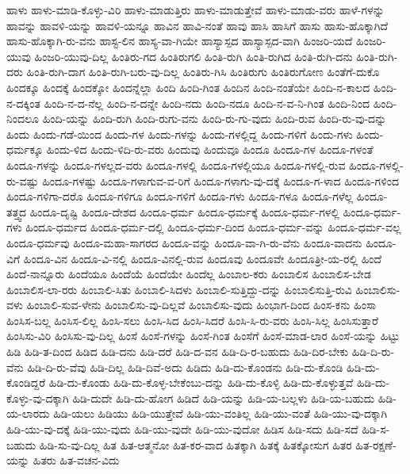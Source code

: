 {ಹಾಳು
ಹಾಳು-ಮಾಡಿ-ಕೊಳ್ಳು-ವಿರಿ
ಹಾಳು-ಮಾಡುತ್ತಿರು
ಹಾಳು-ಮಾಡುತ್ತೇವೆ
ಹಾಳು-ಮಾಡು-ವರು
ಹಾಳೆ-ಗಳನ್ನು
ಹಾವನ್ನು
ಹಾವಳಿ-ಯನ್ನು
ಹಾವಳಿ-ಯನ್ನೂ
ಹಾವಿನ
ಹಾವಿ-ನಂತೆ
ಹಾವು
ಹಾಸಿ
ಹಾಸಿಗೆ
ಹಾಸು
ಹಾಸು-ಹೊಕ್ಕಾಗಿದೆ
ಹಾಸು-ಹೊಕ್ಕಾಗಿ-ರು-ವನು
ಹಾಸ್ಟ-ಲಿನ
ಹಾಸ್ಯ-ವಾ-ಗಿಯೇ
ಹಾಸ್ಯಾಸ್ಪದ
ಹಾಸ್ಯಾಸ್ಪದ-ವಾಗಿ
ಹಿಂಜರಿ-ಯದೆ
ಹಿಂಜರಿ-ಯುವು
ಹಿಂಜರಿ-ಯುವು-ದಿಲ್ಲ
ಹಿಂತಿರು-ಗದ
ಹಿಂತಿರುಗಲಿ
ಹಿಂತಿ-ರುಗಿ
ಹಿಂತಿ-ರುಗಿದ
ಹಿಂತಿ-ರುಗಿ-ದನು
ಹಿಂತಿ-ರುಗಿ-ದರು
ಹಿಂತಿ-ರುಗಿ-ದಾಗ
ಹಿಂತಿ-ರುಗಿ-ಬರು-ವು-ದಿಲ್ಲ
ಹಿಂತಿರು-ಗಿಸಿ
ಹಿಂತಿರುಗು
ಹಿಂತಿರುಗೋಣ
ಹಿಂತೆಗೆ-ದುಕೊ
ಹಿಂದಕ್ಕೂ
ಹಿಂದಕ್ಕೆ
ಹಿಂದಕ್ಕೋ
ಹಿಂದನ್ನೆಲ್ಲಾ
ಹಿಂದಿ
ಹಿಂದಿ-ಗಿಂತ
ಹಿಂದಿನ
ಹಿಂದಿ-ನಂತೆಯೇ
ಹಿಂದಿ-ನ-ಕಾಲದ
ಹಿಂದಿ-ನ-ದಕ್ಕಿಂತ
ಹಿಂದಿ-ನ-ದ-ನೆಲ್ಲ
ಹಿಂದಿ-ನ-ದನ್ನೇ
ಹಿಂದಿ-ನದು
ಹಿಂದಿ-ನದೂ
ಹಿಂದಿ-ನ-ವ-ನಿ-ಗಿಂತ
ಹಿಂದಿ-ನಿಂದ
ಹಿಂದಿ-ನಿಂದಲೂ
ಹಿಂದಿ-ಯನ್ನು
ಹಿಂದಿ-ರುಗಿ
ಹಿಂದಿ-ರುಗು-ವನು
ಹಿಂದಿ-ರು-ಗು-ವುದು
ಹಿಂದಿ-ರುವ
ಹಿಂದಿ-ರು-ವು-ದನ್ನು
ಹಿಂದು
ಹಿಂದು-ಗಡೆ-ಯಿಂದ
ಹಿಂದು-ಗಳ
ಹಿಂದು-ಗಳನ್ನು
ಹಿಂದು-ಗಳಲ್ಲಿದ್ದ
ಹಿಂದು-ಗಳಿಗೆ
ಹಿಂದು-ಗಳು
ಹಿಂದು-ಧರ್ಮಕ್ಕೂ
ಹಿಂದು-ಳಿದ
ಹಿಂದು-ಳಿದಿ-ರು-ವರು
ಹಿಂದುವು
ಹಿಂದುವೂ
ಹಿಂದೂ
ಹಿಂದೂ-ಗಳ
ಹಿಂದೂ-ಗಳಂತೆ
ಹಿಂದೂ-ಗಳನ್ನು
ಹಿಂದೂ-ಗಳಲ್ಲದ-ವರು
ಹಿಂದೂ-ಗಳಲ್ಲಿ
ಹಿಂದೂ-ಗಳಲ್ಲಿಯೂ
ಹಿಂದೂ-ಗಳಲ್ಲಿ-ರುವ
ಹಿಂದೂ-ಗಳಲ್ಲಿ-ರು-ವಷ್ಟು
ಹಿಂದೂ-ಗಳಷ್ಟು
ಹಿಂದೂ-ಗಳಾಗುವ-ವ-ರಿಗೆ
ಹಿಂದೂ-ಗಳಾಗು-ವು-ದಕ್ಕೆ
ಹಿಂದೂ-ಗ-ಳಾದ
ಹಿಂದೂ-ಗಳಿಂದ
ಹಿಂದೂ-ಗಳಿಗಾ-ದರೊ
ಹಿಂದೂ-ಗಳಿಗೂ
ಹಿಂದೂ-ಗಳಿಗೆ
ಹಿಂದೂ-ಗಳು
ಹಿಂದೂ-ಗಳೂ
ಹಿಂದೂ-ಗಳೆಲ್ಲ
ಹಿಂದೂ-ತತ್ತ್ವದ
ಹಿಂದೂ-ದೃಷ್ಟಿ
ಹಿಂದೂ-ದೇಶದ
ಹಿಂದೂ-ಧರ್ಮ
ಹಿಂದೂ-ಧರ್ಮಕ್ಕೆ
ಹಿಂದೂ-ಧರ್ಮ-ಗಳಲ್ಲಿ
ಹಿಂದೂ-ಧರ್ಮ-ಗಳು
ಹಿಂದೂ-ಧರ್ಮದ
ಹಿಂದೂ-ಧರ್ಮ-ದಲ್ಲಿ
ಹಿಂದೂ-ಧರ್ಮ-ದಿಂದ
ಹಿಂದೂ-ಧರ್ಮ-ವನ್ನು
ಹಿಂದೂ-ಧರ್ಮ-ವಲ್ಲ
ಹಿಂದೂ-ಧರ್ಮವು
ಹಿಂದೂ-ಮಹಾ-ಸಾಗರದ
ಹಿಂದೂ-ವನ್ನು
ಹಿಂದೂ-ವಾ-ಗಿ-ರು-ವೆನು
ಹಿಂದೂ-ವಾದನು
ಹಿಂದೂ-ವಿಗೆ
ಹಿಂದೂ-ವಿನ
ಹಿಂದೂ-ವಿ-ನಲ್ಲಿ
ಹಿಂದೂ-ವಿನಲ್ಲಿ-ರುವ
ಹಿಂದೂವು
ಹಿಂದೂವೇ
ಹಿಂದೂತ್ರೀ-ಯ-ರಲ್ಲಿ
ಹಿಂದೆ
ಹಿಂದೆ-ನಾನ್ನೂರು
ಹಿಂದೆಯೂ
ಹಿಂದೆಯೆ
ಹಿಂದೆಯೇ
ಹಿಂದೆಲ್ಲ
ಹಿಂಬಾಲ-ಕರು
ಹಿಂಬಾಲಿಸ
ಹಿಂಬಾಲಿಸ-ಬೇಡ
ಹಿಂಬಾಲಿಸ-ಲಾ-ರರು
ಹಿಂಬಾಲಿ-ಸಿತು
ಹಿಂಬಾಲಿ-ಸಿದಳು
ಹಿಂಬಾಲಿ-ಸುತ್ತಿದ್ದು-ದನ್ನು
ಹಿಂಬಾಲಿಸುತ್ತಿ-ರುವಿ
ಹಿಂಬಾಲಿಸು-ವಳು
ಹಿಂಬಾಲಿ-ಸುವ-ಳೇನು
ಹಿಂಬಾಲಿಸು-ವು-ದಿಲ್ಲವೆ
ಹಿಂಬಾಲಿಸು-ವುದು
ಹಿಂಭಾಗ-ದಿಂದ
ಹಿಂಸ-ಕನು
ಹಿಂಸಾ
ಹಿಂಸಿಸ-ಬಲ್ಲ
ಹಿಂಸಿಸ-ಲಿಲ್ಲ
ಹಿಂಸಿ-ಸಲು
ಹಿಂಸಿ-ಸಿದ
ಹಿಂಸಿ-ಸಿದರೆ
ಹಿಂಸಿ-ಸಿ-ರು-ವರು
ಹಿಂಸಿ-ಸಿಲ್ಲ
ಹಿಂಸಿಸುತ್ತಾರೆ
ಹಿಂಸಿಸು-ವಿರಿ
ಹಿಂಸಿಸು-ವು-ದಿಲ್ಲ
ಹಿಂಸೆ
ಹಿಂಸೆ-ಗಳನ್ನು
ಹಿಂಸೆ-ಗಿಂತ
ಹಿಂಸೆಗೆ
ಹಿಂಸೆ-ಮಾಡ-ಲಾರ
ಹಿಂಸೆ-ಯನ್ನು
ಹಿಟ್ಟು
ಹಿಡಿ
ಹಿಡಿ-ತ-ದಿಂದ
ಹಿಡಿದ
ಹಿಡಿ-ದನು
ಹಿಡಿ-ದರೆ
ಹಿಡಿ-ದ-ವನ
ಹಿಡಿ-ದಿ-ರ-ಬಹುದು
ಹಿಡಿ-ದಿರ-ಬೇಕು
ಹಿಡಿ-ದಿ-ರು-ವೆನು
ಹಿಡಿ-ದಿ-ರು-ವೆವು
ಹಿಡಿ-ದಿಲ್ಲ
ಹಿಡಿ-ದಿವೆ-ಅದು
ಹಿಡಿದು
ಹಿಡಿ-ದು-ಕೊಂಡನು
ಹಿಡಿ-ದು-ಕೊಂಡಿ
ಹಿಡಿ-ದು-ಕೊಂಡಿದ್ದರೆ
ಹಿಡಿ-ದು-ಕೊಂಡು
ಹಿಡಿ-ದು-ಕೊಳ್ಳ-ಬೇಕೆಂಬು-ದನ್ನು
ಹಿಡಿ-ದು-ಕೊಳ್ಳಿ
ಹಿಡಿ-ದು-ಕೊಳ್ಳುತ್ತವೆ
ಹಿಡಿ-ದು-ಕೊಳ್ಳು-ವು-ದಕ್ಕಾಗಿ
ಹಿಡಿ-ದುದೇ
ಹಿಡಿ-ದು-ಹೋಗ
ಹಿಡಿದೆ
ಹಿಡಿ-ಯನ್ನು
ಹಿಡಿ-ಯ-ಬಲ್ಲಳು
ಹಿಡಿ-ಯ-ಬಹುದು
ಹಿಡಿ-ಯ-ಲಾರದು
ಹಿಡಿ-ಯಲು
ಹಿಡಿಯು
ಹಿಡಿ-ಯುತ್ತೇವೆ
ಹಿಡಿ-ಯು-ವಂತಿಲ್ಲ
ಹಿಡಿ-ಯು-ವಂತೆ
ಹಿಡಿ-ಯು-ವು-ದಕ್ಕಾಗಿ
ಹಿಡಿ-ಯು-ವು-ದಕ್ಕೆ
ಹಿಡಿ-ಯು-ವುದು
ಹಿಡಿ-ಯು-ವುದೇ
ಹಿಡಿ-ಯು-ವುದೋ
ಹಿಡಿಸ
ಹಿಡಿ-ಸದು
ಹಿಡಿ-ಸದೆ
ಹಿಡಿ-ಸ-ಬಹುದು
ಹಿಡಿ-ಸು-ವು-ದಿಲ್ಲ
ಹಿತ
ಹಿತ-ಆತ್ಮನೋ
ಹಿತ-ಕರ-ವಾದ
ಹಿತಕ್ಕಾಗಿ
ಹಿತಕ್ಕೆ
ಹಿತಕ್ಕೋಸುಗ
ಹಿತರ
ಹಿತ-ರಕ್ಷಣೆ-ಯನ್ನು
ಹಿತರು
ಹಿತ-ವಚನ-ವಿದು
}
